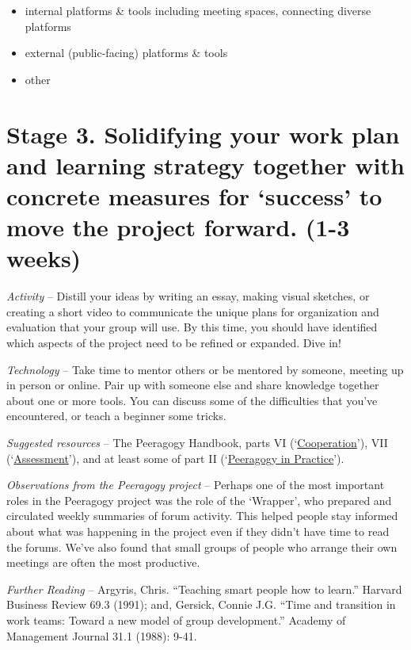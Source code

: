 \begin{itemize}
\tightlist
\item
  internal platforms \& tools including meeting spaces, connecting
  diverse platforms
\item
  external (public-facing) platforms \& tools
\item
  other
\end{itemize}

\hypertarget{stage-3.-solidifying-your-work-plan-and-learning-strategy-together-with-concrete-measures-for-success-to-move-the-project-forward.-1-3-weeks}{%
\section{Stage 3. Solidifying your work plan and learning strategy
together with concrete measures for `success' to move the project
forward. (1-3
weeks)}\label{stage-3.-solidifying-your-work-plan-and-learning-strategy-together-with-concrete-measures-for-success-to-move-the-project-forward.-1-3-weeks}}

\emph{Activity} -- Distill your ideas by writing an essay, making visual
sketches, or creating a short video to communicate the unique plans for
organization and evaluation that your group will use. By this time, you
should have identified which aspects of the project need to be refined
or expanded. Dive in!

\emph{Technology} -- Take time to mentor others or be mentored by
someone, meeting up in person or online. Pair up with someone else and
share knowledge together about one or more tools. You can discuss some
of the difficulties that you've encountered, or teach a beginner some
tricks.

\emph{Suggested resources} -- The Peeragogy Handbook, parts VI
(`\href{http://peeragogy.org/co-facilitation/}{Cooperation}'), VII
(`\href{http://peeragogy.org/assessment/}{Assessment}'), and at least
some of part II
(`\href{http://peeragogy.org/patterns-usecases/}{Peeragogy in
Practice}').

\emph{Observations from the Peeragogy project} -- Perhaps one of the
most important roles in the Peeragogy project was the role of the
`Wrapper', who prepared and circulated weekly summaries of forum
activity. This helped people stay informed about what was happening in
the project even if they didn't have time to read the forums. We've also
found that small groups of people who arrange their own meetings are
often the most productive.

\emph{Further Reading} -- Argyris, Chris. ``Teaching smart people how to
learn.'' Harvard Business Review 69.3 (1991); and, Gersick, Connie J.G.
``Time and transition in work teams: Toward a new model of group
development.'' Academy of Management Journal 31.1 (1988): 9-41.

